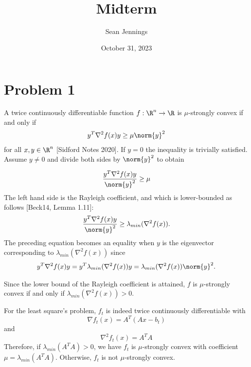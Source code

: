 \documentclass{homework}
\title{Midterm}
\author{Sean Jennings}
\date{October 31, 2023}
\begin{document}
\maketitle

\section{Problem 1}

\begin{letterenum}
    \item A twice continuously differentiable function $f: \R^n \to \R$ is
        $\mu$-strongly convex if and only if
        \begin{equation*}
            y^T \nabla^2 f(x) y \geq \mu \norm{y}^2
        \end{equation*}
        for all $x,y \in \R^n$ [Sidford Notes 2020]. If $y=0$ the inequality
        is trivially satisfied. Assume $y\neq 0$ and divide both sides by $\norm{y}^2$
        to obtain

        \begin{equation*}
            \frac{y^T \nabla^2 f(x) y}{\norm{y}^2} \geq \mu
        \end{equation*}
        The left hand side is the Rayleigh coefficient,
        and which is lower-bounded as follows [Beck14, Lemma 1.11]:
        \begin{equation*}
            \frac{y^T \nabla^2 f(x) y}{\norm{y}^2} \geq \lambda_{min} (\nabla^2 f(x)).
        \end{equation*}
        The preceding equation becomes an equality when $y$ is the eigenvector
        corresponding to $\lambda_{min}(\nabla^2 f(x))$ since
        \begin{equation*}
            y^T \nabla^2 f(x) y = y^T \lambda_{min}(\nabla^2 f(x)) y
                = \lambda_{min}(\nabla^2 f(x)) \norm{y}^2.
        \end{equation*}

        Since the lower bound of the Rayleigh coefficient is attained,
        $f$ is $\mu$-strongly convex if and only if $\lambda_{min} (\nabla^2f(x)) > 0$.

        For the least square's problem, $f_t$ is indeed twice continuously
        differentiable with
        \begin{equation*}
            \nabla f_t(x) = A^T(Ax - b_t)
        \end{equation*}
        and
        \begin{equation*}
            \nabla^2 f_t(x) = A^TA
        \end{equation*}
        Therefore, if $\lambda_{min}(A^TA) > 0$, we have $f_t$ is $\mu$-strongly
        convex with coefficient $\mu = \lambda_{min}(A^TA)$. Otherwise, $f_t$
        is not $\mu$-strongly convex.


\end{letterenum}
\end{document}
